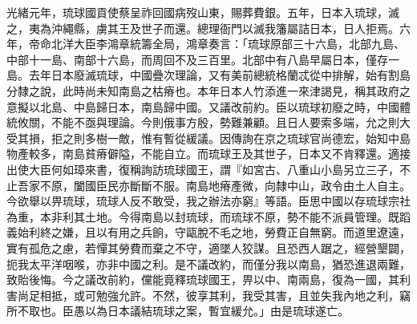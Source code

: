 \begin{pinyinscope}
光緒元年，琉球國貢使蔡呈祚回國病歿山東，賜葬費銀。五年，日本入琉球，滅之，夷為沖繩縣，虜其王及世子而還。總理衙門以滅我籓屬詰日本，日人拒焉。六年，帝命北洋大臣李鴻章統籌全局，鴻章奏言：「琉球原部三十六島，北部九島、中部十一島、南部十六島，而周回不及三百里。北部中有八島早屬日本，僅存一島。去年日本廢滅琉球，中國疊次理論，又有美前總統格蘭忒從中排解，始有割島分隸之說，此時尚未知南島之枯瘠也。本年日本人竹添進一來津謁見，稱其政府之意擬以北島、中島歸日本，南島歸中國。又議改前約。臣以琉球初廢之時，中國體統攸關，不能不亟與理論。今則俄事方殷，勢難兼顧。且日人要索多端，允之則大受其損，拒之則多樹一敵，惟有暫從緩議。因傳詢在京之琉球官尚德宏，始知中島物產較多，南島貧瘠僻隘，不能自立。而琉球王及其世子，日本又不肯釋還。適接出使大臣何如璋來書，復稱詢訪琉球國王，謂『如宮古、八重山小島另立三子，不止吾家不原，闔國臣民亦斷斷不服。南島地瘠產微，向隸中山，政令由土人自主。今欲舉以畀琉球，琉球人反不敢受，我之辦法亦窮』等語。臣思中國以存琉球宗社為重，本非利其土地。今得南島以封琉球，而琉球不原，勢不能不派員管理。既蹈義始利終之嫌，且以有用之兵餉，守甌脫不毛之地，勞費正自無窮。而道里遼遠，實有孤危之慮，若憚其勞費而棄之不守，適墜人狡謀。且恐西人踞之，經營墾闢，扼我太平洋咽喉，亦非中國之利。是不議改約，而僅分我以南島，猶恐進退兩難，致貽後悔。今之議改前約，儻能竟釋琉球國王，畀以中、南兩島，復為一國，其利害尚足相抵，或可勉強允許。不然，彼享其利，我受其害，且並失我內地之利，竊所不取也。臣愚以為日本議結琉球之案，暫宜緩允。」由是琉球遂亡。


\end{pinyinscope}